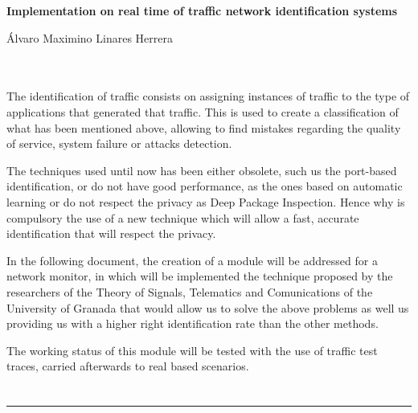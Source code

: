 \thispagestyle{empty}


\begin{center}
{\large\bfseries Implementation on real time of traffic network identification systems}\\
\end{center}
\begin{center}
Álvaro Maximino Linares Herrera\\
\end{center}

\\

\vspace{0.7cm}
\\

The identification of traffic consists on assigning instances of traffic to the type of applications that generated that traffic. This 
is used to create a classification of what has been mentioned above, allowing to find mistakes regarding the quality of service, 
system failure or attacks detection.

\intro The techniques used until now has been either obsolete, such us the port-based identification, or do not have good performance, 
as the ones based on automatic learning or do not respect the privacy as Deep Package Inspection. Hence why is compulsory the use of a 
new technique which will allow a fast, accurate identification that will respect the privacy.

\intro In the following document, the creation of a module will be addressed for a network monitor, in which will be implemented the 
technique proposed by the researchers of the Theory of Signals, Telematics and Comunications of the University of Granada that would 
allow us to solve the above problems as well us providing us with a higher right identification rate than the other methods.

\intro The working status of this module will be tested with the use of traffic test traces, carried afterwards to real based 
scenarios.

\chapter*{}
\thispagestyle{empty}

\noindent\rule[-1ex]{\textwidth}{2pt}\\[4.5ex]

